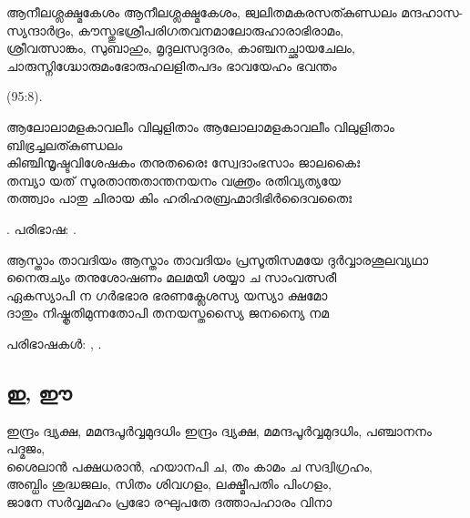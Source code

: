 \begin{enumerate}


\begin{slokam}{\VSr}{\Melp}{ആനീലശ്ലക്ഷ്മകേശം}
ആനീലശ്ലക്ഷ്മകേശം, ജ്വലിതമകരസത്കുണ്ഡലം മന്ദഹാസ- \\ 
സ്യന്ദാർദ്രം, കൗസ്തുഭശ്രീപരിഗതവനമാലോരുഹാരാഭിരാമം, \\ 
ശ്രീവത്സാങ്കം, സുബാഹും, മൃദുലസദുദരം, കാഞ്ചനച്ഛായചേലം, \\
ചാരുസ്നിഗ്ദ്ധോരുമംഭോരുഹലളിതപദം ഭാവയേഹം ഭവന്തം
\end{slokam}


 (95:8). 


\begin{slokam}{\VSv}{\Amar}{ആലോലാമളകാവലീം വിലുളിതാം}
  ആലോലാമളകാവലീം വിലുളിതാം ബിഭ്രച്ചലത്കുണ്ഡലം\\
  കിഞ്ചിന്മൃഷ്ടവിശേഷകം തനുതരൈഃ സ്വേദാംഭസാം ജാലകൈഃ\\
  തമ്പ്യാ യത്  സുരതാന്തതാന്തനയനം വക്ത്രം രതിവ്യത്യയേ\\
  തത്ത്വാം പാതു ചിരായ കിം ഹരിഹരബ്രഹ്മാദിഭിർദൈവതൈഃ
\end{slokam}



.  പരിഭാഷ: .



\begin{slokam}{\VSv}{\Sank}{ആസ്താം താവദിയം}
ആസ്താം താവദിയം പ്രസൂതിസമയേ ദുർവ്വാരശൂലവ്യഥാ\\
നൈരുച്യം തനുശോഷണം മലമയീ ശയ്യാ ച സാംവത്സരീ\\
ഏകസ്യാപി ന ഗർഭഭാര ഭരണക്ലേശസ്യ യസ്യാ ക്ഷമോ\\
ദാതും നിഷ്കൃതിമുന്നതോപി തനയസ്തസ്യൈ ജനന്യൈ നമ
\end{slokam}


പരിഭാഷകൾ:  , .

\end{enumerate}
\subsection{ഇ, ഈ}

\begin{enumerate}

\begin{slokam}{\VSv}{\Unk}{ഇന്ദ്രം ദ്വ്യക്ഷ, മമന്ദപൂര്‍വ്വമുദധിം}
ഇന്ദ്രം ദ്വ്യക്ഷ, മമന്ദപൂര്‍വ്വമുദധിം, പഞ്ചാനനം പദ്മജം,\\
ശൈലാന്‍ പക്ഷധരാന്‍, ഹയാനപി ച, തം കാമം ച സദ്വിഗ്രഹം,\\
അബ്ധിം ശുദ്ധജലം, സിതം ശിവഗളം, ലക്ഷ്മീപതിം പിംഗളം,\\
ജാനേ സര്‍വ്വമഹം പ്രഭോ രഘുപതേ ദത്താപഹാരം വിനാ
\end{slokam}


\end{enumerate}
